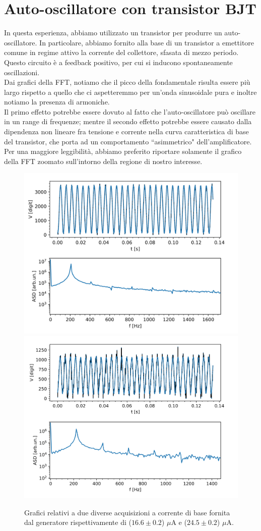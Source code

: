 \documentclass{article}[a4paper, oneside,11pt]
\begin{document}
\section{Auto-oscillatore con transistor BJT}
In questa esperienza, abbiamo utilizzato un transistor per produrre un auto-oscillatore. In particolare, abbiamo fornito alla base di un transistor a emettitore comune in regime attivo la corrente del collettore, sfasata di mezzo periodo. Questo circuito è a feedback positivo, per cui si inducono spontaneamente oscillazioni.\\
Dai grafici della FFT, notiamo che il picco della fondamentale risulta essere più largo rispetto a quello che ci aspetteremmo per un'onda sinusoidale pura e inoltre notiamo la presenza di armoniche.\\
Il primo effetto potrebbe essere dovuto al fatto che l'auto-oscillatore può oscillare in un range di frequenze; mentre il secondo effetto potrebbe essere causato dalla dipendenza non lineare fra  tensione e corrente nella curva caratteristica di base del transistor, che porta ad un comportamento ``asimmetrico" dell'amplificatore.\\
Per una maggiore leggibilità, abbiamo preferito riportare solamente il grafico della FFT zoomato sull'intorno della regione di nostro interesse.

\begin{figure}[H]
    \centering
    \includegraphics[width=0.48\columnwidth]{img/ese11/16.6uA-10us.png}
    \includegraphics[width=0.48\columnwidth]{img/ese11/24.5uA-10us.png}
    \caption{Grafici relativi a due diverse acquisizioni a corrente di base fornita dal generatore rispettivamente di ($16.6 \pm 0.2$) $\mu$A e ($24.5 \pm 0.2$) $\mu$A.}
    \label{fig:ese11}
\end{figure}
\end{document}
